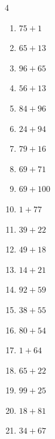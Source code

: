 \begin{multicols}{4}
\begin{enumerate}
  \item $75+1$
        \phantom{$=76$}

  \item $65+13$
        \phantom{$=78$}

  \item $96+65$
        \phantom{$=161$}

  \item $56+13$
        \phantom{$=69$}

  \item $84+96$
        \phantom{$=180$}

  \item $24+94$
        \phantom{$=118$}

\columnbreak %

\resetques

  \item $79+16$
        \phantom{$=95$}

  \item $69+71$
        \phantom{$=140$}

  \item $69+100$
        \phantom{$=169$}

  \item $1+77$
        \phantom{$=78$}

  \item $39+22$
        \phantom{$=61$}

  \item $49+18$
        \phantom{$=67$}

  \item $14+21$
        \phantom{$=35$}

  \item $92+59$
        \phantom{$=151$}

  \item $38+55$
        \phantom{$=93$}

  \item $80+54$
        \phantom{$=134$}

  \item $1+64$
        \phantom{$=65$}

  \item $65+22$
        \phantom{$=87$}

  \item $99+25$
        \phantom{$=124$}

  \item $18+81$
        \phantom{$=99$}

  \item $34+67$
        \phantom{$=101$}


\end{enumerate}
\end{multicols}
